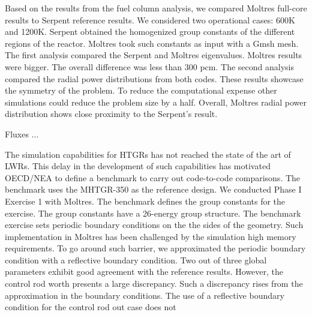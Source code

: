 \documentclass[11pt,letterpaper]{article}
\begin{document}
Based on the results from the fuel column analysis, we compared Moltres full-core results to Serpent reference results.
We considered two operational cases: 600K and 1200K.
Serpent obtained the homogenized group constants of the different regions of the reactor.
Moltres took such constants as input with a Gmsh mesh.
The first analysis compared the Serpent and Moltres eigenvalues.
Moltres results were bigger.
The overall difference was less than 300 pcm.
The second analysis compared the radial power distributions from both codes.
These results showcase the symmetry of the problem.
To reduce the computational expense other simulations could reduce the problem size by a half.
Overall, Moltres radial power distribution shows close proximity to the Serpent's result.

Fluxes ...




The simulation capabilities for HTGRs has not reached the state of the art of LWRs.
This delay in the development of such capabilities has motivated OECD/NEA to define a benchmark to carry out code-to-code comparisons.
The benchmark uses the MHTGR-350 as the reference design.
We conducted Phase I Exercise 1 with Moltres.
The benchmark defines the group constants for the exercise.
The group constants have a 26-energy group structure.
The benchmark exercise sets periodic boundary conditions on the the sides of the geometry.
Such implementation in Moltres has been challenged by the simulation high memory requirements.
To go around such barrier, we approximated the periodic boundary condition with a reflective boundary condition.
Two out of three global parameters exhibit good agreement with the reference results.
However, the control rod worth presents a large discrepancy.
Such a discrepancy rises from the approximation in the boundary conditions.
The use of a reflective boundary condition for the control rod out case does not 


\pagebreak


\end{document}

